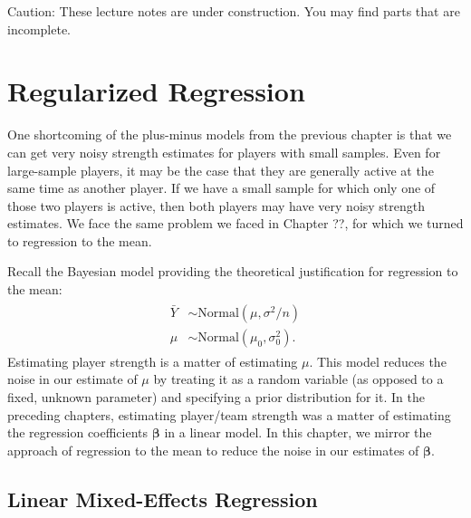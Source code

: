\documentclass{article}
\begin{document}
  \begin{framed}
    {\sc Caution:} These lecture notes are under construction. You may find parts that are incomplete.
  \end{framed}

  \setcounter{section}{4}
  \section{\sc Regularized Regression}

  One shortcoming of the plus-minus models from the previous chapter is that we can get very noisy strength estimates for players with small samples. Even for large-sample players, it may be the case that they are generally active at the same time as another player. If we have a small sample for which only one of those two players is active, then both players may have very noisy strength estimates. We face the same problem we faced in Chapter ??, for which we turned to regression to the mean.

  Recall the Bayesian model providing the theoretical justification for regression to the mean:
  \begin{align}
    \label{eqn-regression-to-the-mean-model}
    \begin{split}
      \bar Y &\sim \mbox{Normal}(\mu, \sigma^2 / n)\\
      \mu &\sim \mbox{Normal}(\mu_0, \sigma^2_0).
    \end{split}
  \end{align}
  Estimating player strength is a matter of estimating $\mu$. This model reduces the noise in our estimate of $\mu$ by treating it as a random variable (as opposed to a fixed, unknown parameter) and specifying a prior distribution for it. In the preceding chapters, estimating player/team strength was a matter of estimating the regression coefficients $\boldsymbol{\beta}$ in a linear model. In this chapter, we mirror the approach of regression to the mean to reduce the noise in our estimates of $\boldsymbol{\beta}$.

  \subsection{\sc Linear Mixed-Effects Regression}
\end{document}
